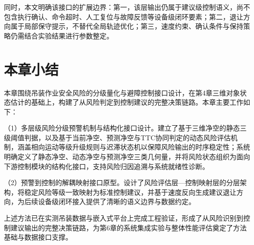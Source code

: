 同时，本文明确该接口的扩展边界：第一，该层输出仍属于建议级控制语义，尚不包含执行确认、命令超时、人工复位与故障反馈等设备级闭环要素；第二，退让方向属于局部保守提示，不替代全局轨迹优化；第三，速度约束、确认条件与保持策略仍需结合实验结果进行参数整定。

\section{本章小结}\label{sec:ch5_summary}

本章围绕吊装作业安全风险的分级量化与避障控制接口设计，在第4章三维对象状态估计的基础上，构建了从风险判定到控制建议的完整决策链路。本章主要工作如下：

（1）多层级风险分级预警机制与结构化接口设计。建立了基于三维净空的静态三级阈值判据，以及基于当前净空、预测净空与TTC协同判定的动态风险评估机制，涵盖相向运动等级升级规则与迟滞状态机以保障风险输出的时序稳定性；系统明确定义了静态净空、动态净空与预测净空三类几何量，并将风险状态组织为面向下游控制模块的结构化接口，支持风险归因追溯与系统就绪性诊断。

（2）预警到控制的解耦映射接口原型。设计了风险评估层—控制映射层的分层架构，将稳定风险等级一致映射为标准控制建议，并基于速度反向生成建议退让方向，为后续设备级闭环接入提供了清晰的语义边界与数据约定。

上述方法已在实测吊装数据与嵌入式平台上完成工程验证，形成了从风险识别到控制建议输出的完整决策链路，为第6章的系统集成实验与整体性能评估奠定了方法基础与数据接口支撑。
